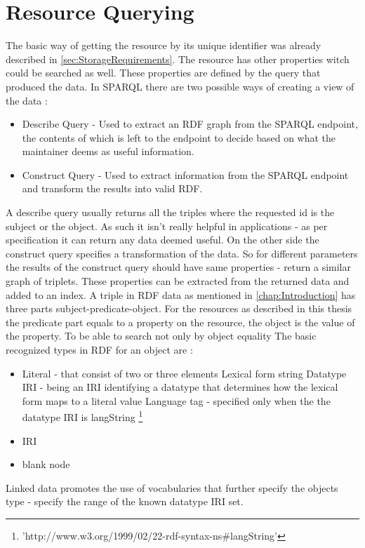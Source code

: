 \section{Resource Querying}
The basic way of getting the resource by its unique identifier was already described in \autoref{sec:StorageRequirements}. The resource has other properties witch could be searched as well. These properties are defined by the query that produced the data. In SPARQL there are two possible ways of creating a view of the data \cite{onlineSparqlQueryLanguageSpec}:
\begin{itemize}
	\item Describe Query - Used to extract an RDF graph from the SPARQL endpoint, the contents of which is left to the endpoint to decide based on what the maintainer deems as useful information.
	\item Construct Query - Used to extract information from the SPARQL endpoint and transform the results into valid RDF.
\end{itemize}
A describe query usually returns all the triples where the requested id is the subject or the object. As such it isn't really helpful in applications - as per specification it can return any data deemed useful. On the other side the construct query specifies a transformation of the data. So for different parameters the results of the construct query should have same properties - return a similar graph of triplets. These properties can be extracted from the returned data and added to an index. A triple in RDF data as mentioned in \autoref{chap:Introduction} has three parts subject-predicate-object. For the resources as described in this thesis the predicate part equals to a property on the resource, the object is the value of the property. To be able to search not only by object equality  The basic recognized types in RDF for an object are \cite{onlineRdfConcepts}:
\begin{itemize}
	\item Literal - that consist of two or three elements %
		\subitem Lexical form string
		\subitem Datatype IRI - being an IRI identifying a datatype that determines how the lexical form maps to a literal value
		\subitem Language tag - specified only when the the datatype IRI is langString \footnote{'http://www.w3.org/1999/02/22-rdf-syntax-ns\#langString'}
	\item IRI
	\item blank node
\end{itemize}
Linked data promotes the use of vocabularies %
that further specify the objects type - specify the range of the known datatype IRI set. 


